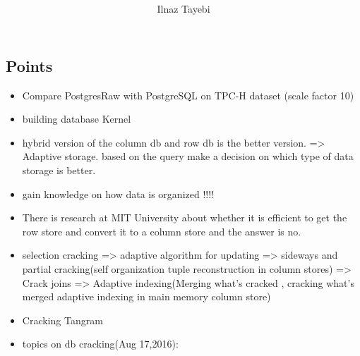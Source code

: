 \documentclass[sigconf,natbib=false]{acmart}
\begin{document}
\title{\begin{placeholder}\end{placeholder}}

\author{Ilnaz Tayebi}

\fancyfoot{}
\thispagestyle{empty}
\renewcommand\footnotetextcopyrightpermission[1]{}
\pagestyle{plain}


\begin{draft}

\section{Points}
\begin{itemize}
    \item Compare PostgresRaw with PostgreSQL on TPC-H dataset (scale factor 10)
    \item building database Kernel
    \item hybrid version of the column db and row db is the better version. => Adaptive storage. based on the query make a decision on which type of data storage is better.
    \item gain knowledge on how data is organized !!!!
    \item There is research at MIT University about whether it is efficient to get the row store and convert it to a column store and the answer is no.
    \item selection cracking => adaptive algorithm for updating => sideways and partial cracking(self organization tuple reconstruction in column stores) => Crack joins => Adaptive indexing(Merging what's cracked , cracking what's merged adaptive indexing in main memory column store)
    \item Cracking Tangram
    \item topics on db cracking(Aug 17,2016): 
\end{itemize}


\end{draft}
\end{document}
